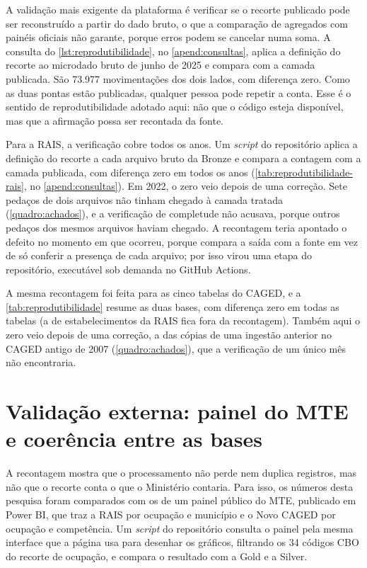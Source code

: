 A validação mais exigente da plataforma é verificar se o recorte publicado pode ser reconstruído a partir do dado bruto, o que a comparação de agregados com painéis oficiais não garante, porque erros podem se cancelar numa soma. A consulta do \autoref{lst:reprodutibilidade}, no \autoref{apend:consultas}, aplica a definição do recorte ao microdado bruto de junho de 2025 e compara com a camada publicada. São 73.977 movimentações dos dois lados, com diferença zero. Como as duas pontas estão publicadas, qualquer pessoa pode repetir a conta. Esse é o sentido de reprodutibilidade adotado aqui: não que o código esteja disponível, mas que a afirmação possa ser recontada da fonte.

Para a RAIS, a verificação cobre todos os anos. Um \textit{script} do repositório aplica a definição do recorte a cada arquivo bruto da Bronze e compara a contagem com a camada publicada, com diferença zero em todos os anos (\autoref{tab:reprodutibilidade-rais}, no \autoref{apend:consultas}). Em 2022, o zero veio depois de uma correção. Sete pedaços de dois arquivos não tinham chegado à camada tratada (\autoref{quadro:achados}), e a verificação de completude não acusava, porque outros pedaços dos mesmos arquivos haviam chegado. A recontagem teria apontado o defeito no momento em que ocorreu, porque compara a saída com a fonte em vez de só conferir a presença de cada arquivo; por isso virou uma etapa do repositório, executável sob demanda no GitHub Actions.

A mesma recontagem foi feita para as cinco tabelas do CAGED, e a \autoref{tab:reprodutibilidade} resume as duas bases, com diferença zero em todas as tabelas (a de estabelecimentos da RAIS fica fora da recontagem). Também aqui o zero veio depois de uma correção, a das cópias de uma ingestão anterior no CAGED antigo de 2007 (\autoref{quadro:achados}), que a verificação de um único mês não encontraria.



\section{Validação externa: painel do MTE e coerência entre as bases}
\label{sec:validacao-mte}
\label{sec:coerencia-bases}

A recontagem mostra que o processamento não perde nem duplica registros, mas não que o recorte conta o que o Ministério contaria. Para isso, os números desta pesquisa foram comparados com os de um painel público do MTE, publicado em Power BI, que traz a RAIS por ocupação e município e o Novo CAGED por ocupação e competência. Um \textit{script} do repositório consulta o painel pela mesma interface que a página usa para desenhar os gráficos, filtrando os 34 códigos CBO do recorte de ocupação, e compara o resultado com a Gold e a Silver.

